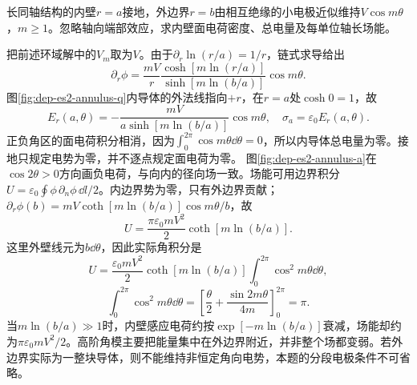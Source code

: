 \begin{example}[环域电势的内壁响应]
长同轴结构的内壁$r=a$接地，外边界$r=b$由相互绝缘的小电极近似维持$V\cos m\theta$，$m\geq1$。忽略轴向端部效应，求内壁面电荷密度、总电量及每单位轴长场能。
\end{example}
\begin{solution}
把前述环域解中的$V_m$取为$V$。由于$\partial_r\ln(r/a)=1/r$，链式求导给出
\[\partial_r\phi=\frac{mV}{r}\frac{\cosh[m\ln(r/a)]}{\sinh[m\ln(b/a)]}\cos m\theta.\]
图\ref{fig:dep-es2-annulus-q}内导体的外法线指向$+r$，在$r=a$处$\cosh0=1$，故
\[
 E_r(a,\theta)=-\frac{mV}{a\sinh[m\ln(b/a)]}\cos m\theta,
 \quad\sigma_a=\varepsilon_0E_r(a,\theta).
\]
正负角区的面电荷积分相消，因为$\int_0^{2\pi}\cos m\theta\dd\theta=0$，所以内导体总电量为零。接地只规定电势为零，并不逐点规定面电荷为零。
图\ref{fig:dep-es2-annulus-a}在$\cos2\theta>0$方向画负电荷，与向内的径向场一致。场能可用边界积分$U=\varepsilon_0\oint\phi\,\partial_n\phi\,\dd l/2$。内边界势为零，只有外边界贡献；$\partial_r\phi(b)=mV\coth[m\ln(b/a)]\cos m\theta/b$，故
\[
 U=\frac{\pi\varepsilon_0mV^2}{2}\coth[m\ln(b/a)].
\]
这里外壁线元为$b\dd\theta$，因此实际角积分是
\[U=\frac{\varepsilon_0mV^2}{2}\coth[m\ln(b/a)]\int_0^{2\pi}\cos^2m\theta\dd\theta,
\]
\[\int_0^{2\pi}\cos^2m\theta\dd\theta
=\left[\frac\theta2+\frac{\sin2m\theta}{4m}\right]_0^{2\pi}=\pi.\]
当$m\ln(b/a)\gg1$时，内壁感应电荷约按$\exp[-m\ln(b/a)]$衰减，场能却约为$\pi\varepsilon_0mV^2/2$。高阶角模主要把能量集中在外边界附近，并非整个场都变弱。若外边界实际为一整块导体，则不能维持非恒定角向电势，本题的分段电极条件不可省略。
\end{solution}
